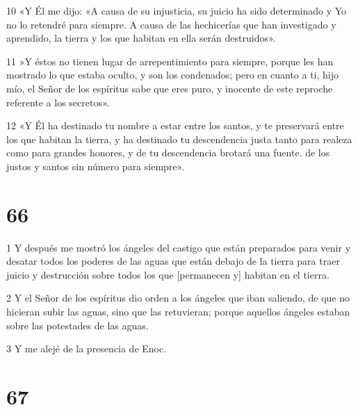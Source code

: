 \par 10 «Y Él me dijo: «A causa de su injusticia, su juicio ha sido determinado y Yo no lo retendré para siempre. A causa de las hechicerías que han investigado y aprendido, la tierra y los que habitan en ella serán destruidos».
\par 11 »Y éstos no tienen lugar de arrepentimiento para siempre, porque les han mostrado lo que estaba oculto, y son los condenados; pero en cuanto a ti, hijo mío, el Señor de los espíritus sabe que eres puro, y inocente de este reproche referente a los secretos».
\par 12 «Y Él ha destinado tu nombre a estar entre los santos, y te preservará entre los que habitan la tierra, y ha destinado tu descendencia justa tanto para realeza como para grandes honores, y de tu descendencia brotará una fuente. de los justos y santos sin número para siempre».

\chapter{66}

\par 1 Y después me mostró los ángeles del castigo que están preparados para venir y desatar todos los poderes de las aguas que están debajo de la tierra para traer juicio y destrucción sobre todos los que [permanecen y] habitan en el tierra.
\par 2 Y el Señor de los espíritus dio orden a los ángeles que iban saliendo, de que no hicieran subir las aguas, sino que las retuvieran; porque aquellos ángeles estaban sobre las potestades de las aguas.
\par 3 Y me alejé de la presencia de Enoc.

\chapter{67}

